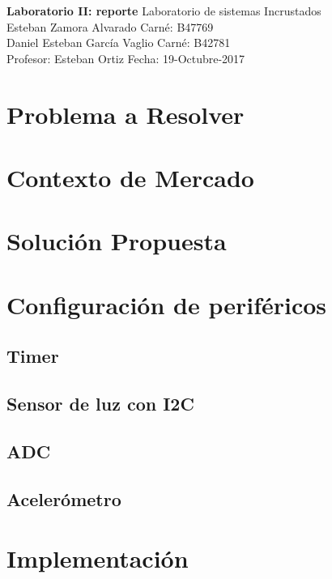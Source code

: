 

\noindent
\large\textbf{Laboratorio II: reporte} \hfill Laboratorio de sistemas Incrustados \\
\normalsize Esteban Zamora Alvarado \hfill Carné: B47769 \\
Daniel Esteban García Vaglio \hfill Carné: B42781 \\
Profesor: Esteban Ortiz  \hfill Fecha: 19-Octubre-2017 \\

\section{Problema a Resolver}


\section{Contexto de Mercado}


\section{Solución Propuesta}



\section{Configuración de periféricos}

\subsection{Timer}

\subsection{Sensor de luz con I2C}


\subsection{ ADC}

\subsection{Acelerómetro}

\section{Implementación}


